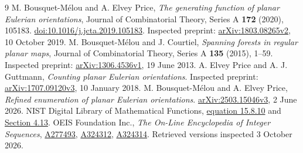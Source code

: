 \documentclass[11pt]{article}
\numberwithin{equation}{section}
\theoremstyle{remark}\newtheorem{remark}[theorem]{Remark}
\begin{document}
\begin{thebibliography}{9}
M. Bousquet-M\'elou and A. Elvey Price,
\emph{The generating function of planar Eulerian orientations},
Journal of Combinatorial Theory, Series A \textbf{172} (2020), 105183.
\href{https://doi.org/10.1016/j.jcta.2019.105183}{doi:10.1016/j.jcta.2019.105183}.
Inspected preprint: \href{https://arxiv.org/abs/1803.08265v2}{arXiv:1803.08265v2}, 10 October 2019.
M. Bousquet-M\'elou and J. Courtiel,
\emph{Spanning forests in regular planar maps},
Journal of Combinatorial Theory, Series A \textbf{135} (2015), 1--59.
Inspected preprint: \href{https://arxiv.org/abs/1306.4536v1}{arXiv:1306.4536v1}, 19 June 2013.
A. Elvey Price and A. J. Guttmann,
\emph{Counting planar Eulerian orientations}.
Inspected preprint: \href{https://arxiv.org/abs/1707.09120v3}{arXiv:1707.09120v3}, 10 January 2018.
M. Bousquet-M\'elou and A. Elvey Price,
\emph{Refined enumeration of planar Eulerian orientations}.
\href{https://arxiv.org/abs/2503.15046v3}{arXiv:2503.15046v3}, 2 June 2026.
NIST Digital Library of Mathematical Functions,
\href{https://dlmf.nist.gov/15.8.E10}{equation 15.8.10}
and \href{https://dlmf.nist.gov/4.13}{Section 4.13}.
OEIS Foundation Inc., \emph{The On-Line Encyclopedia of Integer Sequences},
\href{https://oeis.org/A277493}{A277493},
\href{https://oeis.org/A324312}{A324312},
\href{https://oeis.org/A324314}{A324314}.
Retrieved versions inspected 3 October 2026.
\end{thebibliography}
\end{document}
